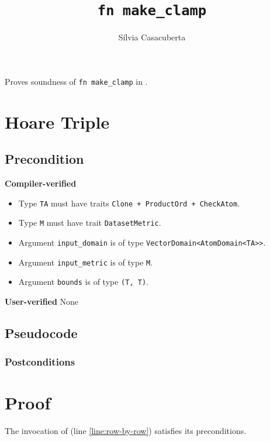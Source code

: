 \documentclass{article}
\title{\texttt{fn make\_clamp}}
\author{S\'ilvia Casacuberta}
\date{}
\begin{document}
 
 
\maketitle 
 
Proves soundness of \texttt{fn make\_clamp} in . 
 
\section{Hoare Triple} 
\subsection*{Precondition} 
 
\textbf{Compiler-verified} 
\begin{itemize} 
    \item Type \texttt{TA} must have traits \texttt{Clone + ProductOrd + CheckAtom}. 
    \item Type \texttt{M} must have trait \texttt{DatasetMetric}. 
    \item Argument \texttt{input\_domain} is of type \texttt{VectorDomain<AtomDomain<TA>>}. 
    \item Argument \texttt{input\_metric} is of type \texttt{M}. 
    \item Argument \texttt{bounds} is of type \texttt{(T, T)}. 
\end{itemize} 
 
\textbf{User-verified} 
None 
 
\subsection*{Pseudocode} 
 
 
\subsubsection*{Postconditions} 
 
\section{Proof} 
 
\begin{lemma} 
    The invocation of  (line \ref{line:row-by-row}) satisfies its preconditions. 
\end{lemma} 
 
\end{document}
